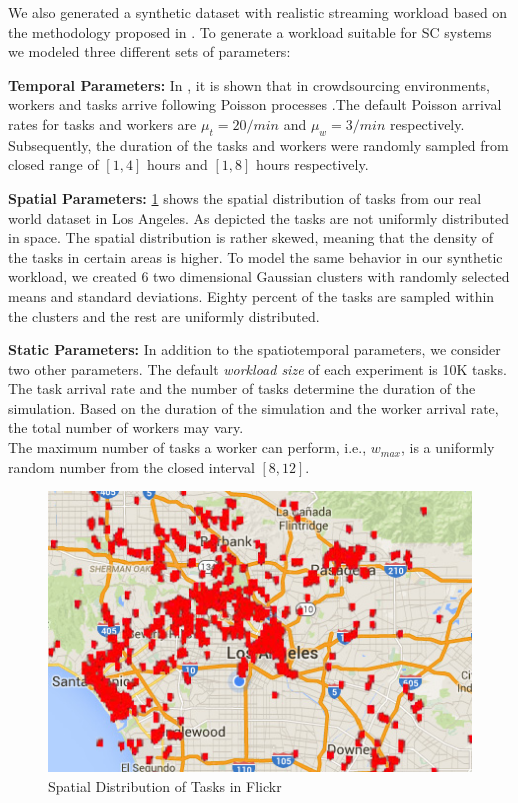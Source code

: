 We also generated a synthetic dataset with realistic streaming workload based on the methodology proposed in \cite{Tang07}. To generate a workload suitable for SC systems we modeled three different sets of parameters:

\vspace{0.1in}
\noindent \textbf{Temporal Parameters:} In \cite{Basu15}, it is shown that in crowdsourcing environments, workers and tasks arrive following Poisson processes \cite{Stoyan87}.The default Poisson arrival rates for tasks and workers are $\mu_t = 20/min$ and $\mu_w = 3/min$ respectively. Subsequently, the duration of the tasks and workers were randomly sampled from closed range of $\left[1,4 \right]$ hours and $\left[1,8 \right]$ hours respectively.

\vspace{0.1in}
\noindent \textbf{Spatial Parameters:} \cref{fig:la_flickr} shows the spatial distribution of tasks from our real world dataset in Los Angeles. As depicted the tasks are not uniformly distributed in space. The spatial distribution is rather skewed, meaning that the density of the tasks in certain areas is higher. To model the same behavior in our synthetic workload, we created 6 two dimensional Gaussian clusters with randomly selected means and standard deviations. Eighty percent of the tasks are sampled within the clusters and the rest are uniformly distributed.

\vspace{0.1in}
\noindent \textbf{Static Parameters:} In addition to the spatiotemporal parameters, we consider two other parameters. The default \emph{workload size} of each experiment is 10K tasks. The task arrival rate and the number of tasks determine the duration of the simulation. Based on the duration of the simulation and the worker arrival rate, the total number of workers may vary.\\
The maximum number of tasks a worker can perform, i.e., $w_{max}$, is a uniformly random number from the closed interval $\left[8,12 \right]$.

\begin{figure}[h]
	\centering
	\includegraphics[scale=0.4]{figures/la_flickr.jpg}
	\caption{Spatial Distribution of Tasks in Flickr}\label{fig:la_flickr}
\end{figure}

